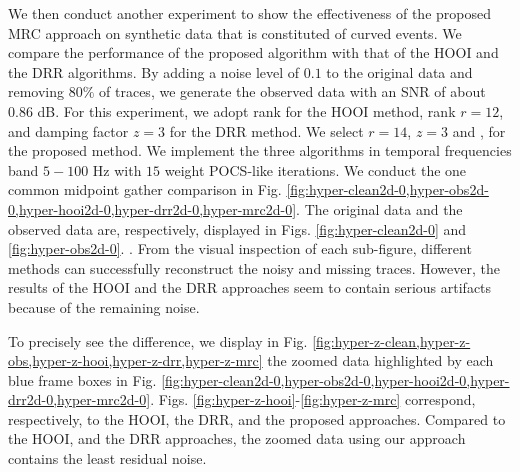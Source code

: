 We then conduct another experiment to show the effectiveness of the proposed MRC approach on synthetic data that is constituted of curved events. We compare the performance of the proposed  algorithm with that of the HOOI and the DRR algorithms. By adding a noise level of $0.1$ to the original data and removing $80\%$ of traces, we generate the observed data with an SNR of about $0.86$ dB. For this experiment, we adopt rank  for the HOOI method, rank $r=12$, and damping factor $z=3$ for the DRR method. We select $r=14$, $z=3$ and , for the proposed  method. We implement the three algorithms in temporal frequencies band $5-100$ Hz with $15$ weight POCS-like iterations. We conduct the one common midpoint gather comparison in Fig. \ref{fig:hyper-clean2d-0,hyper-obs2d-0,hyper-hooi2d-0,hyper-drr2d-0,hyper-mrc2d-0}. The original data and the observed data are, respectively, displayed in Figs. \ref{fig:hyper-clean2d-0} and \ref{fig:hyper-obs2d-0}. . From the visual inspection of each sub-figure, different methods can successfully reconstruct the noisy and missing traces. However, the results of the HOOI and the DRR approaches seem to contain serious artifacts because of the remaining noise.

		
To precisely see the difference, we display in Fig. \ref{fig:hyper-z-clean,hyper-z-obs,hyper-z-hooi,hyper-z-drr,hyper-z-mrc} the zoomed data highlighted by each blue frame boxes in Fig. \ref{fig:hyper-clean2d-0,hyper-obs2d-0,hyper-hooi2d-0,hyper-drr2d-0,hyper-mrc2d-0}.  Figs. \ref{fig:hyper-z-hooi}-\ref{fig:hyper-z-mrc} correspond, respectively, to the HOOI, the DRR, and the proposed approaches. Compared to the HOOI, and the DRR approaches, the zoomed data using our approach contains the least residual noise.

